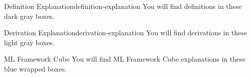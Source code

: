 \begin{definition}{Definition Explanation}{definition-explanation}
You will find definitions in these dark gray boxes.
\end{definition}

\begin{derivation}{Derivation Explanation}{derivation-explanation}
You will find derivations in these light gray boxes.
\end{derivation}

\begin{mlcube}{ML Framework Cube}
You will find ML Framework Cube explanations in these blue wrapped boxes.
\end{mlcube}

